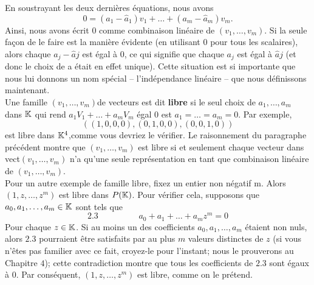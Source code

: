 \documentclass[12pt]{book}
\begin{document}
En soustrayant les deux derni\`eres \'equations, nous avons
\begin{equation*}
    0 =(a_1 - \hat{a}_1)v_1+\ldots+(a_m - \hat{a}_m)v_m.
\end{equation*}
Ainsi, nous avons \'ecrit $0$ comme combinaison lin\'eaire de $(v_1,\ldots,v_m)$. Si la seule façon de le faire est la mani\`ere \'evidente (en utilisant $0$ pour tous les scalaires), alors chaque $a_j - \hat{a}j$ est \'egal \`a $0$, ce qui signifie que chaque $a_j$ est \'egal \`a $\hat{a}j$ (et donc le choix de a \'etait en effet unique). Cette situation est si importante que nous lui donnons un nom sp\'ecial -- l’ind\'ependance lin\'eaire -- que nous d\'efinissons maintenant.\\
\pagebreak
\indent
Une famille $(v_1,\ldots,v_m) $de vecteurs est dit \textbf{libre} si le seul choix de $a_1,\ldots,a_m$ dans $\mathbb{K}$ qui rend $a_1V_1+\ldots+a_mV_m$ \'egal $0$ est $a_1 = \ldots = a_m = 0$. Par exemple,
\begin{equation*}
((1,0,0,0),(0,1,0,0),(0,0,1,0))
\end{equation*}
est libre dans $\mathbb{K}^4$,comme vous devriez le v\'erifier. Le raisonnement du paragraphe pr\'ec\'edent montre que $(v_1,\ldots,v_m)$ est libre si et seulement chaque vecteur dans vect$(v_1,\ldots,v_m)$ n’a qu’une seule repr\'esentation en tant que combinaison lin\'eaire de $(v_1,\ldots,v_m)$.\\
\indent
Pour un autre exemple de famille libre, fixez un entier non négatif m. Alors $(1,z,\ldots,z^m)$ est libre dans $P(\mathbb{K})$. Pour vérifier cela, supposons que $a_0,a_1,\ldots,a_m \in \mathbb{K}$ sont tels que
\begin{equation*}
 \bm{2.3}\hspace{2cm}   a_0 + a_1 +\ldots+ a_mz^m = 0
\end{equation*}
Pour chaque $z \in \mathbb{K}$. Si au moins un des coefficients $a_0,a_1,\ldots,a_m$ \'etaient non nuls, alors $2.3$ pourraient \^etre satisfaits par au plus $m$ valeurs distinctes de $z$ (si vous n’\^etes pas familier avec ce fait, croyez-le pour l’instant; nous le prouverons au Chapitre $4$); cette contradiction montre que tous les coefficients de $2.3$ sont \'egaux \`a $0$. Par cons\'equent, $(1,z,\ldots,z^m)$ est libre, comme on le pr\'etend.\\
\end{document}

